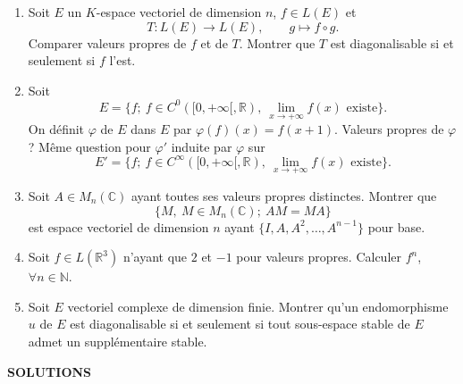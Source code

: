 \begin{enumerate}[label=\arabic*.,leftmargin=2.2em,itemsep=1.0em]
\item Soit $E$ un $K$-espace vectoriel de dimension $n$, $f\in L(E)$ et
\[
T:L(E)\longrightarrow L(E),\qquad g\longmapsto f\circ g.
\]
Comparer valeurs propres de $f$ et de $T$. Montrer que $T$ est diagonalisable si et seulement si $f$ l'est.

\item Soit
\[
E=\{f;\ f\in C^0([0,+\infty[,\mathbb R),\ \lim_{x\to+\infty}f(x)\text{ existe}\}.
\]
On définit $\varphi$ de $E$ dans $E$ par $\varphi(f)(x)=f(x+1)$. Valeurs propres de $\varphi$? Même question pour $\varphi'$ induite par $\varphi$ sur
\[
E'=\{f;\ f\in C^\infty([0,+\infty[,\mathbb R),\ \lim_{x\to+\infty}f(x)\text{ existe}\}.
\]

\item Soit $A\in M_n(\mathbb C)$ ayant toutes ses valeurs propres distinctes. Montrer que
\[
\{M,\ M\in M_n(\mathbb C);\ AM=MA\}
\]
est espace vectoriel de dimension $n$ ayant $\{I,A,A^2,\ldots,A^{n-1}\}$ pour base.

\item Soit $f\in L(\mathbb R^3)$ n'ayant que $2$ et $-1$ pour valeurs propres. Calculer $f^n$, $\forall n\in\mathbb N$.

\item Soit $E$ vectoriel complexe de dimension finie. Montrer qu'un endomorphisme $u$ de $E$ est diagonalisable si et seulement si tout sous-espace stable de $E$ admet un supplémentaire stable.

\end{enumerate}

\clearpage
\begin{center}
{\Large\sffamily\bfseries\color{BellaLavenderDeep} SOLUTIONS}
\end{center}
\vspace{0.8em}

